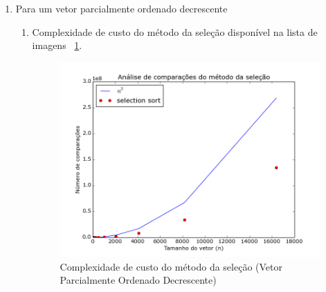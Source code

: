 \documentclass[12pt,a4paper,twoside]{report}
\begin{document}
\begin{enumerate}
\begin{enumerate}
							\end{enumerate}


			\item Para um vetor parcialmente ordenado decrescente
										\begin{enumerate}
											\item Complexidade de custo do método da seleção disponível na lista de imagens ~\ref{fig:SelectionPlot1POD}.
											\begin{figure}[!h]
												\centering
												\includegraphics[scale=0.6]{../imagens/Selection/selection_plot_1_parcialmente_ordenado_decrescente.png}
												\caption{Complexidade de custo do método da seleção (Vetor Parcialmente Ordenado Decrescente) \label{fig:SelectionPlot1POD}}
											\end{figure}



\end{enumerate}
\end{enumerate}
\end{document}
